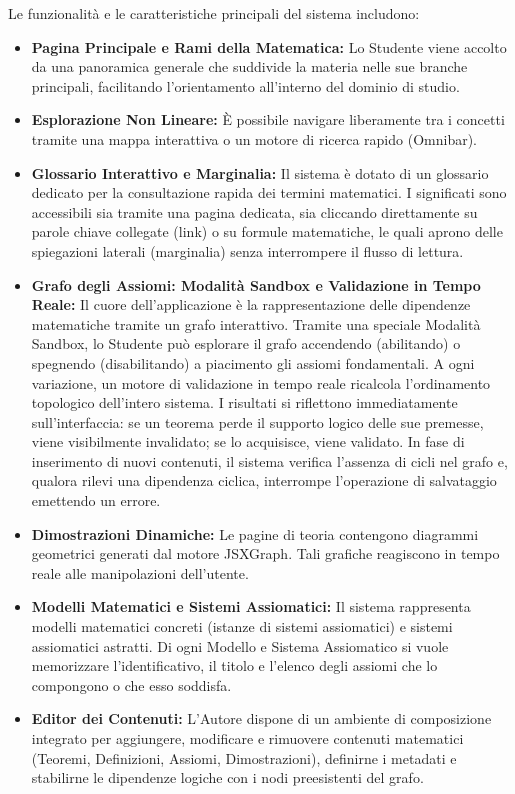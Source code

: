 \documentclass[12pt,a4paper]{article}
\begin{document}
Le funzionalità e le caratteristiche principali del sistema includono:
\begin{itemize}
    \item \textbf{Pagina Principale e Rami della Matematica:} Lo Studente viene accolto da una panoramica generale che suddivide la materia nelle sue branche principali, facilitando l'orientamento all'interno del dominio di studio.
    \item \textbf{Esplorazione Non Lineare:} È possibile navigare liberamente tra i concetti tramite una mappa interattiva o un motore di ricerca rapido (Omnibar).
    \item \textbf{Glossario Interattivo e Marginalia:} Il sistema è dotato di un glossario dedicato per la consultazione rapida dei termini matematici. I significati sono accessibili sia tramite una pagina dedicata, sia cliccando direttamente su parole chiave collegate (link) o su formule matematiche, le quali aprono delle spiegazioni laterali (marginalia) senza interrompere il flusso di lettura.
    \item \textbf{Grafo degli Assiomi: Modalità Sandbox e Validazione in Tempo Reale:} Il cuore dell'applicazione è la rappresentazione delle dipendenze matematiche tramite un grafo interattivo. Tramite una speciale Modalità Sandbox, lo Studente può esplorare il grafo accendendo (abilitando) o spegnendo (disabilitando) a piacimento gli assiomi fondamentali. A ogni variazione, un motore di validazione in tempo reale ricalcola l'ordinamento topologico dell'intero sistema. I risultati si riflettono immediatamente sull'interfaccia: se un teorema perde il supporto logico delle sue premesse, viene visibilmente invalidato; se lo acquisisce, viene validato. In fase di inserimento di nuovi contenuti, il sistema verifica l'assenza di cicli nel grafo e, qualora rilevi una dipendenza ciclica, interrompe l'operazione di salvataggio emettendo un errore.
    \item \textbf{Dimostrazioni Dinamiche:} Le pagine di teoria contengono diagrammi geometrici generati dal motore JSXGraph. Tali grafiche reagiscono in tempo reale alle manipolazioni dell'utente.
    \item \textbf{Modelli Matematici e Sistemi Assiomatici:} Il sistema rappresenta modelli matematici concreti (istanze di sistemi assiomatici) e sistemi assiomatici astratti. Di ogni Modello e Sistema Assiomatico si vuole memorizzare l'identificativo, il titolo e l'elenco degli assiomi che lo compongono o che esso soddisfa.
    \item \textbf{Editor dei Contenuti:} L'Autore dispone di un ambiente di composizione integrato per aggiungere, modificare e rimuovere contenuti matematici (Teoremi, Definizioni, Assiomi, Dimostrazioni), definirne i metadati e stabilirne le dipendenze logiche con i nodi preesistenti del grafo.
\end{itemize}
\end{document}
